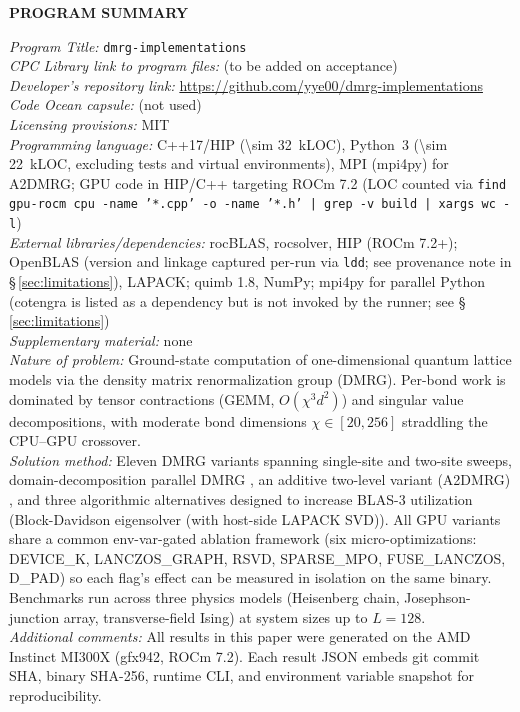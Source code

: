 \documentclass[preprint,12pt]{elsarticle}
\begin{document}
\begin{center}
\textbf{PROGRAM SUMMARY}
\end{center}
\begingroup
\raggedright
\emph{Program Title:} \texttt{dmrg-implementations}\\
\emph{CPC Library link to program files:} (to be added on acceptance)\\
\emph{Developer's repository link:} \url{https://github.com/yye00/dmrg-implementations}\\
\emph{Code Ocean capsule:} (not used)\\
\emph{Licensing provisions:} MIT\\
\emph{Programming language:} C++17/HIP (\SI{\sim 32}{kLOC}), Python~3 (\SI{\sim 22}{kLOC}, excluding tests and virtual environments), MPI (mpi4py) for A2DMRG; GPU code in HIP/C++ targeting ROCm 7.2 (LOC counted via \texttt{find gpu-rocm cpu -name '*.cpp' -o -name '*.h' | grep -v build | xargs wc -l})\\
\emph{External libraries/dependencies:} rocBLAS, rocsolver, HIP (ROCm 7.2+); OpenBLAS (version and linkage captured per-run via \texttt{ldd}; see provenance note in \S\,\ref{sec:limitations}), LAPACK; quimb 1.8, NumPy; mpi4py for parallel Python (cotengra is listed as a dependency but is not invoked by the runner; see \S\,\ref{sec:limitations})\\
\emph{Supplementary material:} none\\[0.5em]
\emph{Nature of problem:} Ground-state computation of one-dimensional quantum lattice models via the density matrix renormalization group (DMRG). Per-bond work is dominated by tensor contractions (GEMM, $O(\chi^3 d^2)$) and singular value decompositions, with moderate bond dimensions $\chi \in [20, 256]$ straddling the CPU--GPU crossover.\\[0.5em]
\emph{Solution method:} Eleven DMRG variants spanning single-site and two-site sweeps, domain-decomposition parallel DMRG \cite{Stoudenmire2013}, an additive two-level variant (A2DMRG) \cite{Grigori2025}, and three algorithmic alternatives designed to increase BLAS-3 utilization (Block-Davidson eigensolver (with host-side LAPACK SVD)). All GPU variants share a common env-var-gated ablation framework (six micro-optimizations: DEVICE\_K, LANCZOS\_GRAPH, RSVD, SPARSE\_MPO, FUSE\_LANCZOS, D\_PAD) so each flag's effect can be measured in isolation on the same binary. Benchmarks run across three physics models (Heisenberg chain, Josephson-junction array, transverse-field Ising) at system sizes up to $L=128$.\\[0.5em]
\emph{Additional comments:} All results in this paper were generated on the AMD Instinct MI300X (gfx942, ROCm 7.2). Each result JSON embeds git commit SHA, binary SHA-256, runtime CLI, and environment variable snapshot for reproducibility.
\endgroup
\end{document}
